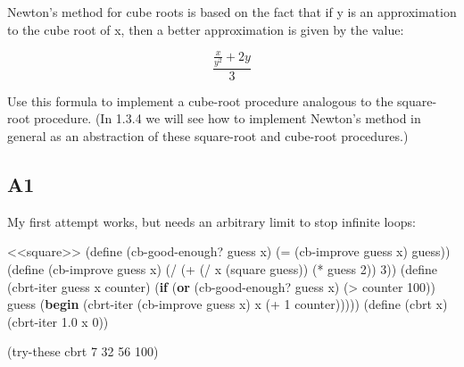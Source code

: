 \documentclass[
]{article}
\newenvironment{Shaded}{}{}
\newcommand{\DecValTok}[1]{\textcolor[rgb]{0.25,0.63,0.44}{#1}}
\newcommand{\ExtensionTok}[1]{#1}
\newcommand{\FloatTok}[1]{\textcolor[rgb]{0.25,0.63,0.44}{#1}}
\newcommand{\FunctionTok}[1]{\textcolor[rgb]{0.02,0.16,0.49}{#1}}
\newcommand{\KeywordTok}[1]{\textcolor[rgb]{0.00,0.44,0.13}{\textbf{#1}}}
\newcommand{\NormalTok}[1]{#1}
\newcommand{\OperatorTok}[1]{\textcolor[rgb]{0.40,0.40,0.40}{#1}}
\begin{document}
Newton's method for cube roots is based on the fact that if y is an
approximation to the cube root of x, then a better approximation is
given by the value:

\begin{equation}
\frac{\frac{x}{y^2} + 2y}{3}
\end{equation}

Use this formula to implement a cube-root procedure analogous to the
square-root procedure. (In 1.3.4 we will see how to implement Newton's
method in general as an abstraction of these square-root and cube-root
procedures.)

\hypertarget{a1}{%
\subsection{A1}\label{a1}}

My first attempt works, but needs an arbitrary limit to stop infinite
loops:

\hypertarget{EX1-8-A1}{%
\label{EX1-8-A1}}%
\begin{Shaded}
\begin{Highlighting}[numbers=left,,]
\NormalTok{\textless{}\textless{}square\textgreater{}\textgreater{}}
\NormalTok{(}\ExtensionTok{define}\FunctionTok{ }\NormalTok{(cb{-}good{-}enough? guess x)}
\NormalTok{  (}\OperatorTok{=}\NormalTok{ (cb{-}improve guess x) guess))}
\NormalTok{(}\ExtensionTok{define}\FunctionTok{ }\NormalTok{(cb{-}improve guess x)}
\NormalTok{  (}\OperatorTok{/}
\NormalTok{   (}\OperatorTok{+}
\NormalTok{    (}\OperatorTok{/}\NormalTok{ x (square guess))}
\NormalTok{    (}\OperatorTok{*}\NormalTok{ guess }\DecValTok{2}\NormalTok{))}
   \DecValTok{3}\NormalTok{))}
\NormalTok{(}\ExtensionTok{define}\FunctionTok{ }\NormalTok{(cbrt{-}iter guess x counter)}
\NormalTok{  (}\KeywordTok{if}\NormalTok{ (}\KeywordTok{or}\NormalTok{ (cb{-}good{-}enough? guess x) (}\OperatorTok{\textgreater{}}\NormalTok{ counter }\DecValTok{100}\NormalTok{))}
\NormalTok{      guess}
\NormalTok{      (}\KeywordTok{begin}
\NormalTok{        (cbrt{-}iter (cb{-}improve guess x) x (}\OperatorTok{+} \DecValTok{1}\NormalTok{ counter)))))}
\NormalTok{(}\ExtensionTok{define}\FunctionTok{ }\NormalTok{(cbrt x)}
\NormalTok{  (cbrt{-}iter }\FloatTok{1.0}\NormalTok{ x }\DecValTok{0}\NormalTok{))}

\NormalTok{(try{-}these cbrt }\DecValTok{7} \DecValTok{32} \DecValTok{56} \DecValTok{100}\NormalTok{)}
\end{Highlighting}
\end{Shaded}
\end{document}
